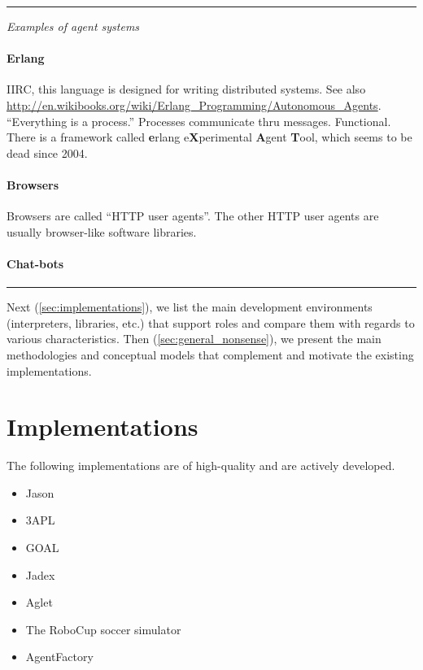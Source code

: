 \documentclass{article}
\newcommand{\fb}[1]{\textbf{#1}}
\newenvironment{notes}{\medskip\hrule\smallskip\narrower}{\smallskip\hrule\medskip}
\begin{document}
\begin{notes}
\emph{Examples of agent systems}

\paragraph{Erlang}
IIRC, this language is designed for writing distributed systems.
See also \url{http://en.wikibooks.org/wiki/Erlang_Programming/Autonomous_Agents}.
``Everything is a process.''
Processes communicate thru messages.
Functional.
There is a framework called \fb erlang e\fb Xperimental \fb Agent \fb Tool, which seems to be dead since 2004.

\paragraph{Browsers}
Browsers are called ``HTTP user agents''.
The other HTTP user agents are usually browser-like software libraries.

\paragraph{Chat-bots}

\end{notes}

Next (\autoref{sec:implementations}), we list the main development environments (interpreters, libraries, etc.) that support roles and compare them with regards to various characteristics.
Then (\autoref{sec:general_nonsense}), we present the main methodologies and conceptual models  that complement and motivate the existing implementations.

\section{Implementations}\label{sec:implementations} %

The following implementations are of high-quality and are actively developed.
\begin{itemize}
\item Jason~\cite{books/sp/map2005/BordiniHV05}
\item 3APL~\cite{books/sp/map2005/DastaniRM05}
\item GOAL~\cite{hindriks2009programmingrationalagents}
\item Jadex~\cite{todo}
\item Aglet~\cite{todo}
\item The RoboCup soccer simulator
\item AgentFactory
\end{itemize}
\end{document}
